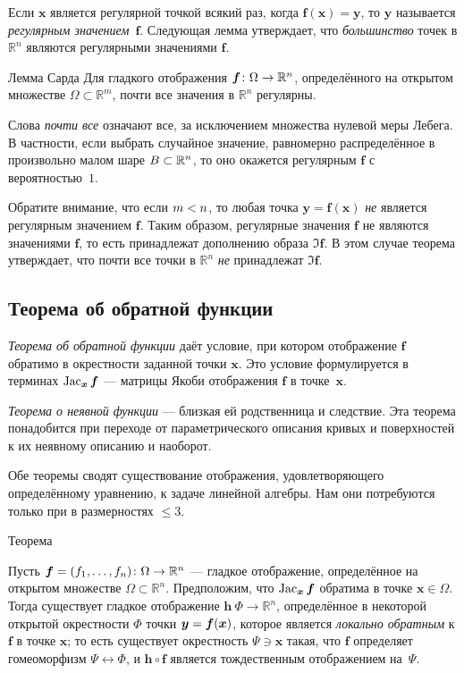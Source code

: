 {Если $\bm{x}$ является регулярной точкой всякий раз, когда $\bm{f}(\bm{x})=\bm{y}$,
то $\bm{y}$ называется \emph{регулярным значением}~$\bm{f}$.
Следующая лемма утверждает, что \textit{большинство} точек в $\mathbb{R}^n$ являются регулярными значениями $\bm{f}$.

\begin{thm}{Лемма Сарда}\label{lem:sard}
Для гладкого отображения $\bm{f}\colon \Omega \z\to \mathbb{R}^n$, определённого на открытом множестве $\Omega\subset \mathbb{R}^m$, почти все значения в $\mathbb{R}^n$ регулярны.
\end{thm}

Слова \emph{почти все} означают все, за исключением множества нулевой меры Лебега.
В частности, если выбрать случайное значение, равномерно распределённое в произвольно малом шаре $B\z\subset \mathbb{R}^n$, то оно окажется регулярным $\bm{f}$ с вероятностью~$1$.

Обратите внимание, что если $m\z<n$, то любая точка $\bm{y}=\bm{f}(\bm{x})$ \textit{не} является регулярным значением $\bm{f}$.
Таким образом, регулярные значения $\bm{f}$ не являются значениями $\bm{f}$, то есть принадлежат дополнению образа $\Im \bm{f}$.
В этом случае теорема утверждает, что почти все точки в $\mathbb{R}^n$ \textit{не} принадлежат $\Im \bm{f}$.

\subsection*{Теорема об обратной функции}

{\sloppy

\emph{Теорема об обратной функции} даёт условие, при котором отображение $\bm{f}$ обратимо в окрестности заданной точки $\bm{x}$.
Это условие формулируется в терминах $\mathop{\rm Jac}\nolimits_{\bm{x}}\bm{f}$ --- матрицы Якоби отображения $\bm{f}$ в точке~$\bm{x}$.

}

\emph{Теорема о неявной функции} --- близкая ей родственница и следствие.
Эта теорема понадобится при переходе от параметрического описания кривых и поверхностей к их неявному описанию и наоборот.

Обе теоремы сводят существование отображения, удовлетворяющего определённому уравнению, к задаче линейной алгебры.
Нам они потребуются только при в размерностях $\le 3$.

\begin{thm}{Теорема}\label{thm:inverse}
{\sloppy
Пусть $\bm{f}=(f_1,\z\dots,f_n)\:\Omega\to\mathbb{R}^n$ --- гладкое отображение, определённое на открытом множестве $\Omega\subset \mathbb{R}^n$.
Предположим, что
$\mathop{\rm Jac}\nolimits_{\bm{x}}\bm{f}$
обратима в точке $\bm{x}\in \Omega$.
Тогда существует гладкое отображение $\bm{h}\:\Phi\to\mathbb{R}^n$, определённое в некоторой открытой окрестности $\Phi$ точки ${\bm{y}}\z=\bm{f}(\bm{x})$, которое является {}\emph{локально обратным} к $\bm{f}$ в точке $\bm{x}$;
то есть существует окрестность $\Psi\ni \bm{x}$ такая, что
$\bm{f}$ определяет гомеоморфизм $\Psi\leftrightarrow \Phi$, и
$\bm{h} \circ \bm{f}$ является тождественным отображением на~$\Psi$.

}
\end{thm}}
